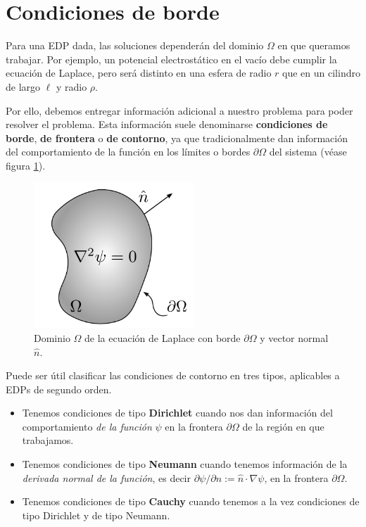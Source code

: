 


\section{Condiciones de borde}

Para una EDP dada, las soluciones dependerán del dominio $\Omega$ en que queramos trabajar. Por ejemplo, un potencial electrostático en el vacío debe cumplir la ecuación de Laplace, pero será distinto en una esfera de radio $r$ que en un cilindro de largo $\ell$ y radio $\rho$. 

Por ello, debemos entregar información adicional a nuestro problema para poder resolver el problema. Esta información suele denominarse \textbf{condiciones de borde}, \textbf{de frontera} o \textbf{de contorno}, ya que tradicionalmente dan información del comportamiento de la función en los límites o bordes $\partial \Omega$ del sistema (véase figura \ref{fig:condicionesdeborde}).

\begin{figure}[htb]
    \centering
    \includegraphics[width = 6cm]{Figuras/Condiciones-Borde.pdf}
    \caption{Dominio $\Omega$ de la ecuación de Laplace con borde $\partial \Omega$ y vector normal $\hat{n}$.}
    \label{fig:condicionesdeborde}
\end{figure}

Puede ser útil clasificar las condiciones de contorno en tres tipos, aplicables a EDPs de segundo orden.

\begin{itemize}
    \item Tenemos condiciones de tipo \textbf{Dirichlet} cuando nos dan información del comportamiento \emph{de la función} $\psi$ en la frontera $\partial \Omega$ de la región en que trabajamos.
    \item Tenemos condiciones de tipo \textbf{Neumann} cuando tenemos información de la \emph{derivada normal de la función}, es decir $\partial \psi/\partial n := \hat{n} \cdot \nabla \psi$, en la frontera $\partial \Omega$.
    \item Tenemos condiciones de tipo \textbf{Cauchy} cuando tenemos a la vez condiciones de tipo Dirichlet y de tipo Neumann.
\end{itemize} 

